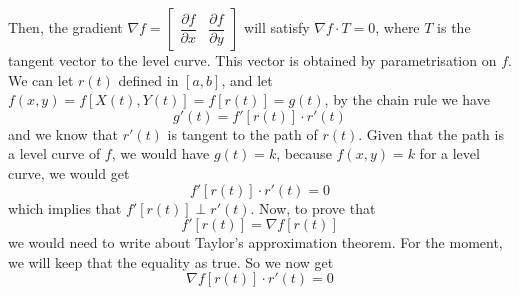 \documentclass[../linear-spaces.tex]{subfiles}
\begin{document}
Then, the gradient $\nabla f = \begin{bmatrix}  \dfrac{\partial f}{\partial x} &  \dfrac{\partial f}{\partial y} \end{bmatrix}$ will 
satisfy $\nabla f \cdot T = 0$, where $T$ is the tangent vector to the level curve. This vector is obtained by parametrisation on 
$f$. We can let $r(t)$ defined in $[a,b]$, and let $f(x,y) = f\left[X(t), Y(t)\right] = f\left[r(t)\right] = g(t)$, by the chain rule 
we have 
\begin{equation}
    g'(t) = f'\left[r(t)\right]\cdot r'(t)
\end{equation}
and we know that $r'(t)$ is tangent to the path of $r(t)$. Given that the path is a level curve of $f$, we would have $g(t) = k$, because 
$f(x,y) = k$ for a level curve, we would get 
 \begin{equation}
    f'\left[r(t)\right]\cdot r'(t) = 0
\end{equation}
which implies that $f'\left[r(t)\right] \perp r'(t)$. Now, to prove that 
\begin{equation}
    f'\left[r(t)\right] = \nabla f[r(t)]
\end{equation}
we would need to write about Taylor's approximation theorem. For the moment, we will keep that the equality as true. So we now get 
\begin{equation}
    \nabla f \left[r(t)\right] \cdot r'(t) = 0
\end{equation} 
\end{document}
